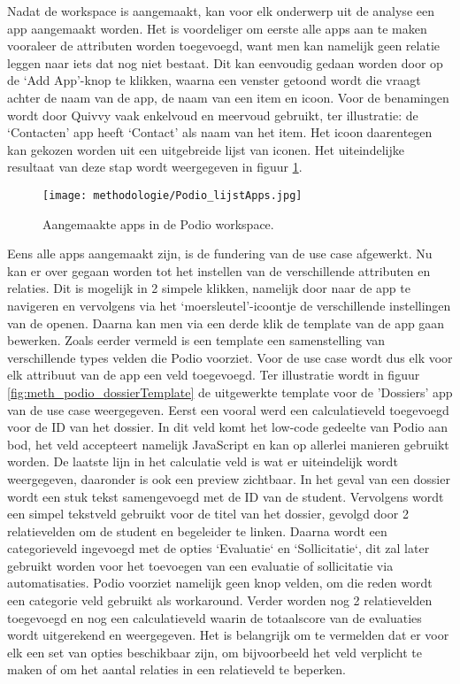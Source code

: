 Nadat de workspace is aangemaakt, kan voor elk onderwerp uit de analyse een app aangemaakt worden. Het is voordeliger om eerste alle apps aan te maken vooraleer de attributen worden toegevoegd, want men kan namelijk geen relatie leggen naar iets dat nog niet bestaat. Dit kan eenvoudig gedaan worden door op de ‘Add App’-knop te klikken, waarna een venster getoond wordt die vraagt achter de naam van de app, de naam van een item en icoon. Voor de benamingen wordt door Quivvy vaak enkelvoud en meervoud gebruikt, ter illustratie: de ‘Contacten’ app heeft ‘Contact’ als naam van het item. Het icoon daarentegen kan gekozen worden uit een uitgebreide lijst van iconen. Het uiteindelijke resultaat van deze stap wordt weergegeven in figuur \ref{fig:meth_podio_lijstApps}. \\

\begin{figure}[ht]
    \centering
    \texttt{[image: methodologie/Podio\_lijstApps.jpg]}
    \caption{Aangemaakte apps in de Podio workspace.}
    \label{fig:meth_podio_lijstApps}
\end{figure}

Eens alle apps aangemaakt zijn, is de fundering van de use case afgewerkt. Nu kan er over gegaan worden tot het instellen van de verschillende attributen en relaties. Dit is mogelijk in 2 simpele klikken, namelijk door naar de app te navigeren en vervolgens via het ‘moersleutel’-icoontje de verschillende instellingen van de openen. Daarna kan men via een derde klik de template van de app gaan bewerken. Zoals eerder vermeld is een template een samenstelling van verschillende types velden die Podio voorziet. Voor de use case wordt dus elk voor elk attribuut van de app een veld toegevoegd. Ter illustratie wordt in figuur \ref{fig:meth_podio_dossierTemplate} de uitgewerkte template voor de 'Dossiers' app van de use case weergegeven. Eerst een vooral werd een calculatieveld toegevoegd voor de ID van het dossier. In dit veld komt het low-code gedeelte van Podio aan bod, het veld accepteert namelijk JavaScript en kan op allerlei manieren gebruikt worden. De laatste lijn in het calculatie veld is wat er uiteindelijk wordt weergegeven, daaronder is ook een preview zichtbaar. In het geval van een dossier wordt een stuk tekst samengevoegd met de ID van de student. Vervolgens wordt een simpel tekstveld gebruikt voor de titel van het dossier, gevolgd door 2 relatievelden om de student en begeleider te linken. Daarna wordt een categorieveld ingevoegd met de opties `Evaluatie` en `Sollicitatie`, dit zal later gebruikt worden voor het toevoegen van een evaluatie of sollicitatie via automatisaties. Podio voorziet namelijk geen knop velden, om die reden wordt een categorie veld gebruikt als workaround. Verder worden nog 2 relatievelden toegevoegd en nog een calculatieveld waarin de totaalscore van de evaluaties wordt uitgerekend en weergegeven. Het is belangrijk om te vermelden dat er voor elk een set van opties beschikbaar zijn, om bijvoorbeeld het veld verplicht te maken of om het aantal relaties in een relatieveld te beperken. \\

